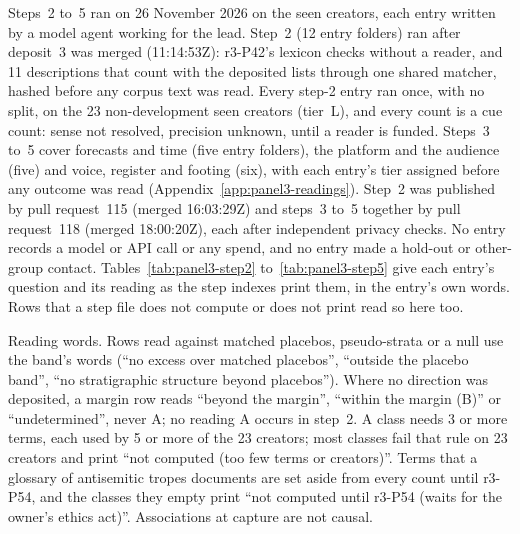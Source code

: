 Steps~2 to~5 ran on 26 November 2026 on the seen creators, each entry written by a model agent working for the lead.
Step~2 (12 entry folders) ran after deposit~3 was merged (11:14:53Z): r3-P42's lexicon checks without a reader, and 11
descriptions that count with the deposited lists through one shared matcher, hashed before any corpus text was read.
Every step-2 entry ran once, with no split, on the 23 non-development seen creators (tier~L), and every count is a cue
count: sense not resolved, precision unknown, until a reader is funded. Steps~3 to~5 cover forecasts and time (five
entry folders), the platform and the audience (five) and voice, register and footing (six), with each entry's tier
assigned before any outcome was read (Appendix~\ref{app:panel3-readings}). Step~2 was published by pull request~115
(merged 16:03:29Z) and steps~3 to~5 together by pull request~118 (merged 18:00:20Z), each after independent privacy
checks. No entry records a model or API call or any spend, and no entry made a hold-out or other-group contact.
Tables~\ref{tab:panel3-step2} to~\ref{tab:panel3-step5} give each entry's question and its reading as the step indexes
print them, in the entry's own words. Rows that a step file does not compute or does not print read so here too.

Reading words. Rows read against matched placebos, pseudo-strata or a null use the band's words (``no excess over
matched placebos'', ``outside the placebo band'', ``no stratigraphic structure beyond placebos''). Where no direction
was deposited, a margin row reads ``beyond the margin'', ``within the margin (B)'' or ``undetermined'', never A; no
reading A occurs in step~2. A class needs 3 or more terms, each used by 5 or more of the 23 creators; most classes fail
that rule on 23 creators and print ``not computed (too few terms or creators)''. Terms that a glossary of antisemitic
tropes documents are set aside from every count until r3-P54, and the classes they empty print ``not computed until
r3-P54 (waits for the owner's ethics act)''. Associations at capture are not causal.

